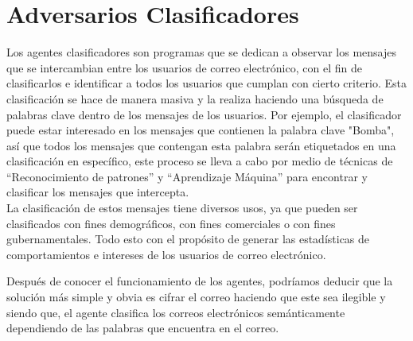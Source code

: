 \documentclass[12pt,oneside,onecolumn,openany]{report}
\begin{document}
\section{Adversarios Clasificadores}
Los agentes clasificadores son programas que se dedican a observar los mensajes que se intercambian  entre  los  usuarios  de  correo  electrónico,  con  el  fin  de  clasificarlos  e 
identificar  a  todos  los  usuarios  que  cumplan  con  cierto  criterio.  Esta  clasificación  se hace de manera masiva y la realiza haciendo una búsqueda de palabras clave dentro de 
los  mensajes de  los usuarios. Por ejemplo, el  clasificador puede estar interesado en  los mensajes  que  contienen  la  palabra  clave  "Bomba",  así  que 
todos  los  mensajes  que contengan esta palabra serán etiquetados en una clasificación en específico, este proceso se lleva a cabo por medio de técnicas de 
“Reconocimiento de patrones” y “Aprendizaje Máquina” para encontrar y clasificar los mensajes que intercepta.\cite{Attacks}\cite{clas}
\\
La  clasificación  de  estos  mensajes  tiene  diversos  usos, ya  que  pueden  ser  clasificados con  fines demográficos, con  fines comerciales o con  fines gubernamentales. Todo esto 
con  el  propósito  de  generar  las  estadísticas  de  comportamientos  e  intereses  de  los usuarios de correo electrónico. 


Después de conocer el funcionamiento de los agentes, podríamos deducir que la solución más simple y obvia es cifrar el correo haciendo que este
 sea ilegible y siendo que, el agente  clasifica  los  correos  electrónicos  semánticamente  dependiendo  de  las  palabras 
que  encuentra  en  el  correo.
\\
\end{document}
